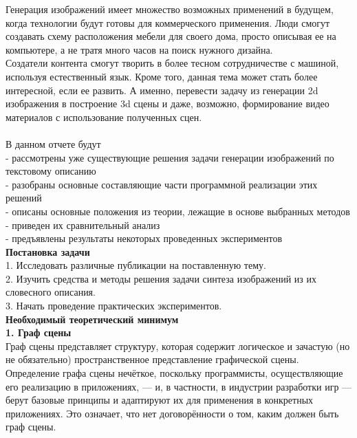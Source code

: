 \documentclass{article}
\begin{document}
    Генерация изображений имеет множество возможных применений в
    будущем, когда технологии будут готовы для коммерческого применения. 
    Люди смогут создавать схему расположения мебели для своего дома, просто описывая ее на компьютере, а не тратя много часов на поиск нужного дизайна.\\ 
    Создатели контента смогут творить в более тесном сотрудничестве с машиной, используя естественный язык.
    Кроме того, данная тема может стать более интересной, если ее развить. А именно, перевести задачу из генерации 2d изображения в построение 3d сцены и даже, возможно, формирование видео материалов с использование полученных сцен.\\ \\
    В данном отчете будут \\
    - рассмотрены уже существующие решения задачи генерации изображений по текстовому описанию\\
    - разобраны основные составляющие части программной реализации этих решений\\
    - описаны основные положения из теории, лежащие в основе выбранных методов\\
    - приведен их сравнительный анализ\\
    - предъявлены результаты некоторых проведенных экспериментов\\
    \newpage
    \huge \textbf{Постановка задачи} \\[1.3cm]
      \large 1. Исследовать различные публикации на поставленную тему.\\
             2. Изучить средства и методы решения задачи синтеза изображений из их словесного описания.\\
             3. Начать проведение практических экспериментов.\\
    \newpage
    \huge \textbf{Необходимый теоретический минимум} \\[1.3cm]
      \large \textbf{1. Граф сцены}\\
      Граф сцены представляет структуру, которая содержит логическое и зачастую (но не обязательно) пространственное представление графической сцены. Определение графа сцены нечёткое, поскольку программисты, осуществляющие его реализацию в приложениях, — и, в частности, в индустрии разработки игр — берут базовые принципы и адаптируют их для применения в конкретных приложениях. Это означает, что нет договорённости о том, каким должен быть граф сцены.
\end{document}
